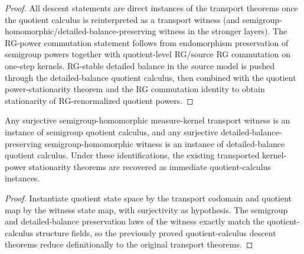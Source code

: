 \begin{proof}
All descent statements are direct instances of the transport theorems once the quotient calculus is reinterpreted as a transport witness (and semigroup-homomorphic/detailed-balance-preserving witness in the stronger layers). The RG-power commutation statement follows from endomorphism preservation of semigroup powers together with quotient-level RG/source RG commutation on one-step kernels. RG-stable detailed balance in the source model is pushed through the detailed-balance quotient calculus, then combined with the quotient power-stationarity theorem and the RG commutation identity to obtain stationarity of RG-renormalized quotient powers.
\end{proof}

\begin{corollary}\label{thm:measure-kernel-transport-quotient-instance-recovery}
Any surjective semigroup-homomorphic measure-kernel transport witness is an instance of semigroup quotient calculus, and any surjective detailed-balance-preserving semigroup-homomorphic witness is an instance of detailed-balance quotient calculus. Under these identifications, the existing transported kernel-power stationarity theorems are recovered as immediate quotient-calculus instances.
\end{corollary}

\begin{proof}
Instantiate quotient state space by the transport codomain and quotient map by the witness state map, with surjectivity as hypothesis. The semigroup and detailed-balance preservation laws of the witness exactly match the quotient-calculus structure fields, so the previously proved quotient-calculus descent theorems reduce definitionally to the original transport theorems.
\end{proof}

